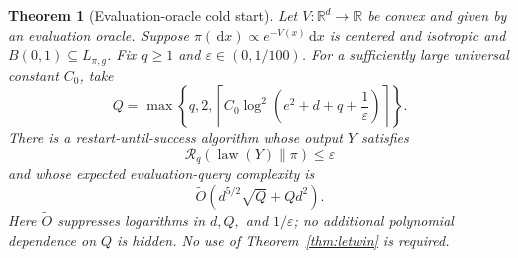 \documentclass[11pt]{article}
\newtheorem{theorem}{Theorem}[section]
\theoremstyle{remark}
\newcommand{\R}{\mathbb R}
\newcommand{\1}{\bm 1}
\newcommand{\eps}{\varepsilon}
\newcommand{\law}{\operatorname{law}}
\newcommand{\dd}{\,\mathrm d}
\begin{document}
\begin{theorem}[Evaluation-oracle cold start]
\label{thm:evaluation-cold-main}
Let $V:\R^d\to\R$ be convex and given by an evaluation oracle.  Suppose
$\pi(\dd x)\propto e^{-V(x)}\dd x$ is centered and isotropic and
$B(0,1)\subseteq L_{\pi,g}$.  Fix $q\geq1$ and
$\eps\in(0,1/100)$.  For a sufficiently large universal constant
$C_0$, take
\begin{equation}\label{eq:evaluation-order-condition}
  Q=\max\left\{q,2,
    \left\lceil C_0\log^2\!\left(e^2+d+q+\frac1\eps\right)\right\rceil
    \right\}.
\end{equation}
There is a restart-until-success algorithm whose output $Y$ satisfies
\[
  \mathcal R_q(\law(Y)\|\pi)\leq\eps
\]
and whose expected evaluation-query complexity is
\begin{equation}\label{eq:evaluation-query-bound}
  \widetilde O\!\left(d^{5/2}\sqrt Q+Qd^2\right).
\end{equation}
Here $\widetilde O$ suppresses logarithms in $d,Q,$ and $1/\eps$; no
additional polynomial dependence on $Q$ is hidden.
No use of Theorem~\ref{thm:letwin} is required.
\end{theorem}
\end{document}
